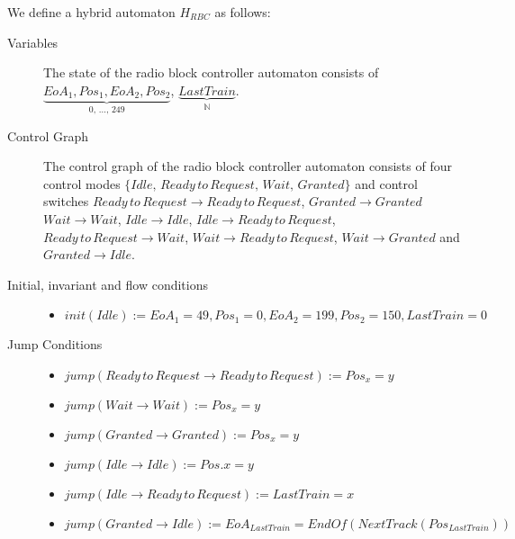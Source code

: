 \begin{mydef}

We define a hybrid automaton $H_{RBC}$ as follows:
\begin{description}
\item[Variables] The state of the radio block controller automaton consists of $\underbrace{EoA_1, Pos_1, EoA_2, Pos_2}_\text{0, \ldots , 249}$, \newline $\underbrace{LastTrain}_{\mathbb{N}}$.

\item[Control Graph] The control graph of the radio block controller automaton consists of four control modes $\{Idle, \, Ready \, to \, Request, \, Wait, \, Granted \}$ and control switches $Ready \, to \, Request \to Ready \, to \, Request$, $Granted \to Granted$ $Wait \to Wait$, $Idle \to Idle$, $Idle \to Ready \, to \, Request$, $Ready \, to \, Request \to Wait$, $Wait \to Ready \, to \, Request$, $Wait \to Granted$ and $Granted \to Idle$.

\item[Initial, invariant and flow conditions] \hspace*{0mm}
	\begin{itemize}
	\item $init(Idle) :=   EoA_1 = 49, Pos_1 = 0, EoA_2 = 199, Pos_2 = 150, LastTrain = 0 $
	\end{itemize}

\item[Jump Conditions] \hspace*{0mm}

	\begin{itemize}
	\item $jump(Ready \, to \, Request \to Ready \, to \, Request) :=  Pos_x = y$
	\item $jump(Wait \to Wait) :=  Pos_x = y$
	\item $jump(Granted \to Granted) :=  Pos_x = y$
	\item $jump(Idle \to Idle) := Pos.x = y$
	\item $jump(Idle \to Ready \, to \, Request) := LastTrain = x$
	\item $jump(Granted \to Idle) := EoA_{LastTrain} = EndOf(NextTrack(Pos_{LastTrain}))$
	\end{itemize}


\end{description}
\end{mydef}
